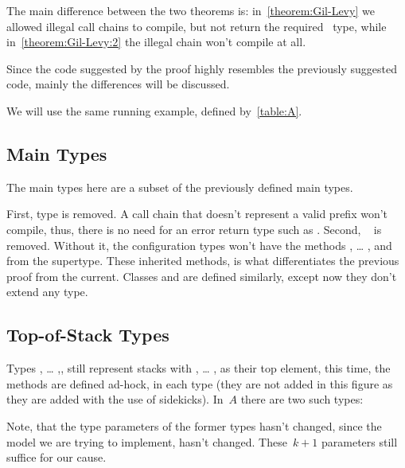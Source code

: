 The main difference between the two theorems is:
  in~\cref{theorem:Gil-Levy} we allowed illegal call chains to compile,
  but not return the required~ type, while in~\cref{theorem:Gil-Levy:2}
  the illegal chain won't compile at all.

Since the code suggested by the proof highly resembles the previously
  suggested code, mainly the differences will be discussed.

We will use the same running example, defined by~\cref{table:A}.

\subsection{Main Types}
The main types here are a subset of the previously defined main types.

\begin{quote}
\end{quote}

First, type  is removed.
A call chain that doesn't represent a valid prefix won't compile,
  thus, there is no need for an error return type such as .
Second, ~ is removed.
Without it, the configuration types won't have the
  methods , … , and \cc{\$()} from the supertype.
These inherited methods, is what differentiates the previous proof from the current.
Classes  and  are defined similarly, except now they don't extend any type.

\subsection{Top-of-Stack Types}
Types , … ,, still represent stacks
  with , … , as their top element,
  this time, the methods are defined ad-hock, in each type
  (they are not added in this figure as they are added with the use of sidekicks).
In~$A$ there are two such types:

\begin{quote}
\end{quote}


Note, that the type parameters of the former types hasn't changed,
  since the model we are trying to implement, hasn't changed.
  These~$k+1$ parameters still suffice for our cause.

